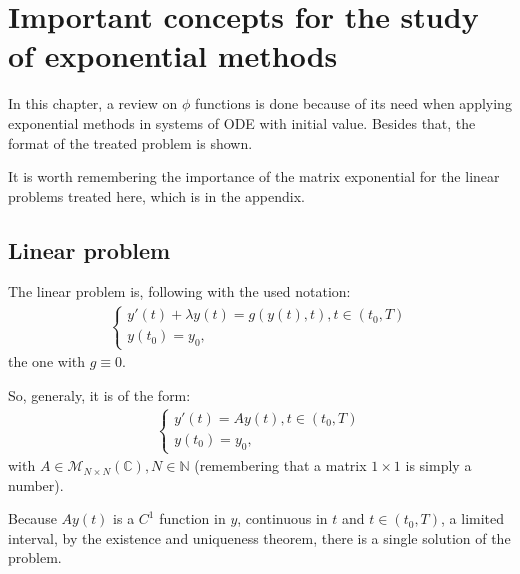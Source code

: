 \documentclass[letterpaper,10pt,english]{jupyterBook}
\begin{document}
\sphinxstepscope


\section{Important concepts for the study of exponential methods}
\label{\detokenize{cap3:important-concepts-for-the-study-of-exponential-methods}}\label{\detokenize{cap3::doc}}
\sphinxAtStartPar
In this chapter, a review on \(\phi\) functions is done because of its need when applying exponential methods in systems of ODE with initial value. Besides that, the format of the treated problem is shown.

\sphinxAtStartPar
It is worth remembering the importance of the matrix exponential for the linear problems treated here, which is in the appendix.


\subsection{Linear problem}
\label{\detokenize{cap3:linear-problem}}
\sphinxAtStartPar
The linear problem is, following with the used notation:
\begin{equation*}
\begin{split}
\begin{cases}
    y'(t) + \lambda y(t) = g(y(t), t), t \in (t_0, T) \\
    y(t_0) = y_0 
    \text{,}
\end{cases}
\end{split}
\end{equation*}
\sphinxAtStartPar
the one with \(g \equiv 0.\)

\sphinxAtStartPar
So, generaly, it is of the form:
\begin{equation*}
\begin{split}
\begin{cases}
    y'(t) = A y(t), t \in (t_0, T) \\
    y(t_0) = y_0 
    \text{,}
\end{cases}
\end{split}
\end{equation*}
\sphinxAtStartPar
with \(A \in \mathscr{M}_{N \times N}(\mathbb{C}), N \in \mathbb{N}\)  (remembering that a matrix \(1 \times 1\) is simply a number).

\sphinxAtStartPar
Because \(A y(t)\) is a \(C^1\) function in \(y\), continuous in \(t\) and \(t \in (t_0, T)\), a limited interval, by the existence and uniqueness theorem, there is a single solution of the problem.
\end{document}
